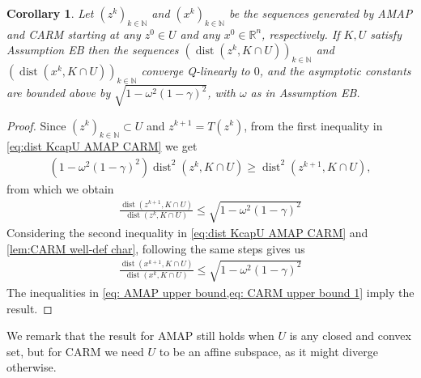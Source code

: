\documentclass[smallextended,numbook,nospthms]{svjour3}
\theoremstyle{plain}
\newtheorem{corollary}[theorem]{Corollary}
\theoremstyle{definition}
\def\RR{\mathds R}
\def\NN{\mathds N}
\DeclareMathOperator{\dist}{dist}
\begin{document}
\begin{corollary}\label{prop:EB Q conv}
	Let $\left(z^{k}\right)_{k \in \NN}$ and $\left(x^{k}\right)_{k \in \NN}$ be the sequences generated by AMAP and CARM starting at any $z^{0} \in U$ and any $x^{0} \in \RR^{n}$, respectively. If $K, U$ satisfy Assumption EB then the sequences $\left(\dist\left(z^{k}, K \cap U\right)\right)_{k \in \NN}$ and $\left(\dist\left(x^{k}, K \cap U\right)\right)_{k \in \NN}$ converge Q-linearly to $0$, and the asymptotic constants are bounded above by $\sqrt{1-\omega^{2}(1-\gamma)^{2}}$, with $\omega$ as in Assumption EB.
\end{corollary}
\begin{proof}
    Since $\left(z^{k}\right)_{k \in \NN} \subset U$ and $z^{k+1}=T\left(z^{k}\right)$, from the first inequality in \cref{eq:dist KcapU AMAP CARM} we get
	\begin{align}
		\left(1-\omega^{2}(1-\gamma)^{2}\right) \dist^{2}\left(z^{k}, K \cap U\right) \geq \dist^{2}\left(z^{k+1}, K \cap U\right),
	\end{align}
    from which we obtain
	\begin{align}\label{eq: AMAP upper bound}
		\frac{\dist\left(z^{k+1}, K \cap U\right)}{\dist\left(z^{k}, K \cap U\right)} \leq \sqrt{1-\omega^{2}(1-\gamma)^{2}}
	\end{align}
	Considering the second inequality in \cref{eq:dist KcapU AMAP CARM} and \cref{lem:CARM well-def char}, following the same steps gives us
	\begin{align}\label{eq: CARM upper bound 1}
		\frac{\dist\left(x^{k+1}, K \cap U\right)}{\dist\left(x^{k}, K \cap U\right)} \leq \sqrt{1-\omega^{2}(1-\gamma)^{2}}
	\end{align}
	The inequalities in \cref{eq: AMAP upper bound,eq: CARM upper bound 1} imply the result.
\end{proof}
We remark that the result for AMAP still holds when $U$ is any closed and convex set, but for  CARM we need $U$ to be an affine subspace, as it might diverge otherwise.
\end{document}
